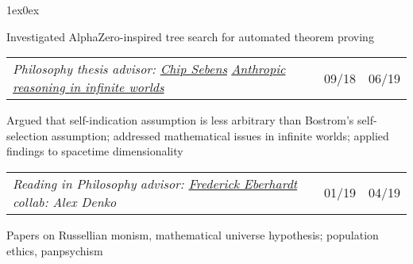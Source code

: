 \documentclass[12pt]{article}
\def\myh{20pt}
\def\indentlen{1ex}
\newcommand{\datecolor}{lavender3}
\let\olditalic\textit
\renewcommand{\textit}[1]{\olditalic{\color{lavender} #1}}
\newcommand{\textittwo}[1]{\olditalic{\color{lavender2} #1}}
\newcommand{\mysmallerverticalspace}{\vspace{2pt}}
\newcommand{\datecolwidth}{29pt}
\newcommand{\titlecolwidth}{\textwidth - \datecolwidth*3 + \myh/2 - 5pt}
\begin{document}
{\begin{adjustwidth}{\indentlen}{0ex}
\color{normaltext}

Investigated AlphaZero-inspired tree search for automated theorem proving

\mysmallerverticalspace

\color{\datecolor}

\begin{tabular}{@{}p{\titlecolwidth}r@{|}p{\datecolwidth}@{}}
\textit{Philosophy thesis} \hspace{\rolesep} \textittwo{advisor: \href{https://sites.google.com/site/csebens/}{Chip Sebens}} \hspace{\rolesep} \href{{https://evgunter.github.io/Anthropic_reasoning_in_infinite_worlds.pdf}}{\it Anthropic reasoning in infinite worlds} & 09/18 & 06/19
\end{tabular}

\color{normaltext}

Argued that self-indication assumption is less arbitrary than Bostrom's self-selection assumption; addressed mathematical issues in infinite worlds; applied findings to spacetime dimensionality

\mysmallerverticalspace

\color{\datecolor}

\begin{tabular}{@{}p{\titlecolwidth}r@{|}p{\datecolwidth}@{}}
\textit{Reading in Philosophy} \hspace{\rolesep} \textittwo{advisor: \href{http://www.its.caltech.edu/~fehardt/}{Frederick Eberhardt} \hspace{\rolesep} collab: Alex Denko} & 01/19 & 04/19
\end{tabular}

\color{normaltext}

Papers on Russellian monism, mathematical universe hypothesis; population ethics, panpsychism


\vspace{-3pt}
\end{adjustwidth}
}
\end{document}
